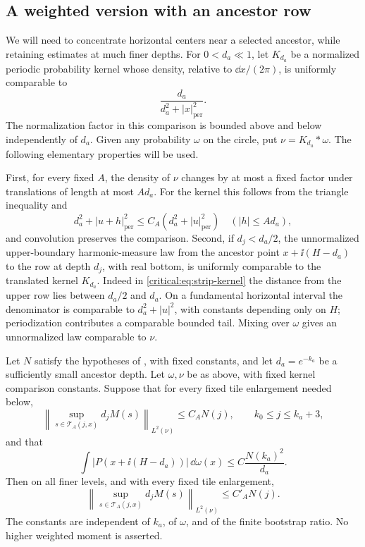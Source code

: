 \subsection{A weighted version with an ancestor row}

We will need to concentrate horizontal centers near a selected
ancestor, while retaining estimates at much finer depths. For
\(0<d_a\ll1\), let \(K_{d_a}\) be a normalized periodic probability
kernel whose density, relative to \(\dd x/(2\pi)\), is uniformly
comparable to
\begin{equation}\label{critical:eq:ancestor-kernel}
 \frac{d_a}{d_a^2+|x|_{\mathrm{per}}^2}.
\end{equation}
The normalization factor in this comparison is bounded above and
below independently of \(d_a\). Given any probability \(\omega\)
on the circle, put \(\nu=K_{d_a}*\omega\). The following elementary
properties will be used.

First, for every fixed \(A\), the density of \(\nu\) changes by at
most a fixed factor under translations of length at most \(A d_a\).
For the kernel this follows from the triangle inequality and
\[
 d_a^2+|u+h|_{\mathrm{per}}^2
 \le C_A(d_a^2+|u|_{\mathrm{per}}^2)
 \quad (|h|\le A d_a),
\]
and convolution preserves the comparison. Second, if
\(d_j<d_a/2\), the unnormalized upper-boundary harmonic-measure law
from the ancestor point \(x+\ii(H-d_a)\) to the row at depth \(d_j\),
with real bottom, is uniformly comparable to the translated kernel
\(K_{d_a}\). Indeed in \eqref{critical:eq:strip-kernel} the distance
from the upper row lies between \(d_a/2\) and \(d_a\). On a
fundamental horizontal interval the denominator is comparable to
\(d_a^2+|u|^2\), with constants depending only on \(H\);
periodization contributes a comparable bounded tail. Mixing over
\(\omega\) gives an unnormalized law comparable to \(\nu\).

\begin{proposition}\label{prop:weighted-bootstrap}
Let \(N\) satisfy the hypotheses of ,
with fixed constants, and let \(d_a=e^{-k_a}\) be a sufficiently
small ancestor depth. Let \(\omega,\nu\) be as above, with fixed
kernel comparison constants. Suppose that for every fixed tile
enlargement needed below,
\begin{equation}\label{critical:eq:weighted-coarse}
 \left\|\sup_{s\in\mathcal T_A(j,x)}d_jM(s)\right\|_{L^2(\nu)}
 \le C_A N(j),\qquad k_0\le j\le k_a+3,
\end{equation}
and that
\begin{equation}\label{critical:eq:weighted-anchor}
 \int |P(x+\ii(H-d_a))|\,\dd\omega(x)
 \le C\frac{N(k_a)^2}{d_a}.
\end{equation}
Then on all finer levels, and with every fixed tile enlargement,
\begin{equation}\label{critical:eq:weighted-conclusion}
 \left\|\sup_{s\in\mathcal T_A(j,x)}d_jM(s)\right\|_{L^2(\nu)}
 \le C'_A N(j).
\end{equation}
The constants are independent of \(k_a\), of \(\omega\), and of the
finite bootstrap ratio. No higher weighted moment is asserted.
\end{proposition}

